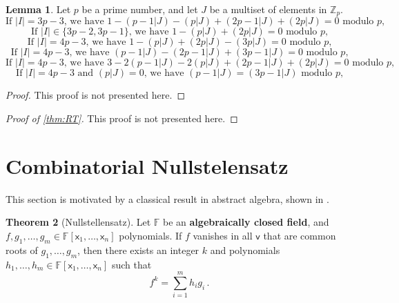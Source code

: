 \documentclass[12pt]{amsart}
\theoremstyle{definition}
\newtheorem{thm}{Theorem}[section]
\newtheorem{lm}[thm]{Lemma}
\newcommand{\Z}{\mathbb{Z}}
\newcommand{\F}{\mathbb{F}}
\newcommand{\vv}{\mathsf{v}}
\newcommand{\vx}{\mathsf{x}}
\begin{document}
\begin{lm}
Let $p$ be a prime number, and let $J$ be a multiset of elements in $\Z_p$.
\begin{equation}
\text{If $|I| = 3p - 3$, we have } 1 - (p-1|J) - (p|J) + (2p-1|J) + (2p|J) = 0 \text{ modulo $p$,}
\end{equation}
\begin{equation}
\text{If $|I| \in \{ 3p - 2, 3p - 1\} $, we have } 1 - (p|J) + (2p|J) = 0 \text{ modulo $p$,}
\end{equation}
\begin{equation}
\text{If $|I| = 4p - 3$, we have } 1 - (p|J) + (2p|J) - (3p|J) = 0 \text{ modulo $p$,}
\end{equation}
\begin{equation}
\text{If $|I| = 4p - 3$, we have } (p-1|J) - (2p-1|J) + (3p-1|J) = 0 \text{ modulo $p$,}
\end{equation}
\begin{equation}
\text{If $|I| = 4p - 3$, we have } 3 - 2 (p-1|J) - 2 (p|J) + (2p-1|J) + (2p|J) = 0 \text{ modulo $p$,}
\end{equation}
\begin{equation}
\text{If $|I| = 4p - 3$ and $(p|J) = 0$, we have } (p-1|J) = (3p-1|J) \text{ modulo $p$,}
\end{equation}
\end{lm}

\begin{proof}
This proof is not presented here.
\end{proof}

\begin{proof}[Proof of \cref{thm:RT}]
This proof is not presented here.
\end{proof}

\section{Combinatorial Nullstelensatz}


This section is motivated by a classical result in abstract algebra, shown in \cite{hilbert1893ueber}.


\begin{thm}[Nullstellensatz]
Let $\F$ be an \textbf{algebraically closed field}, and $f, g_1, \ldots, g_m\in \F[\vx_1, \ldots, \vx_n]$ polynomials.
If $f$ vanishes in all $\vv$ that are common roots of $g_1, \ldots, g_m$, then there exists an integer $k$ and polynomials $h_1, \ldots, h_m \in \F[\vx_1, \ldots, \vx_n]$ such that
$$ f^k = \sum_{i=1}^m h_i g_i \, . $$
\end{thm}
\end{document}
